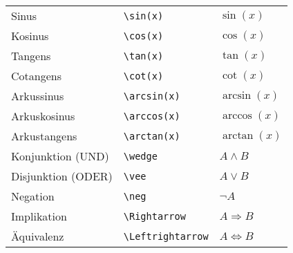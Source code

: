 \begin{longtable}{l l l}
    \midrule
    Sinus                     & \texttt{\textbackslash sin{(x)}}                                                         & $ \sin{(x)} $                        \\
    Kosinus                   & \texttt{\textbackslash cos{(x)}}                                                         & $ \cos{(x)} $                        \\
    Tangens                   & \texttt{\textbackslash tan{(x)}}                                                         & $ \tan{(x)} $                        \\
    Cotangens                 & \texttt{\textbackslash cot{(x)}}                                                         & $ \cot{(x)} $                        \\
    Arkussinus                & \texttt{\textbackslash arcsin{(x)}}                                                      & $ \arcsin{(x)} $                     \\
    Arkuskosinus              & \texttt{\textbackslash arccos{(x)}}                                                      & $ \arccos{(x)} $                     \\
    Arkustangens              & \texttt{\textbackslash arctan{(x)}}                                                      & $ \arctan{(x)} $                     \\

    \midrule
    Konjunktion (UND)         & \texttt{\textbackslash wedge}                                                            & $ A \wedge B $                       \\
    Disjunktion (ODER)        & \texttt{\textbackslash vee}                                                              & $ A \vee B $                         \\
    Negation                  & \texttt{\textbackslash neg}                                                              & $ \neg A $                           \\
    Implikation               & \texttt{\textbackslash Rightarrow}                                                       & $ A \Rightarrow B $                  \\
    Äquivalenz                & \texttt{\textbackslash Leftrightarrow}                                                   & $ A \Leftrightarrow B $              \\


\end{longtable}
